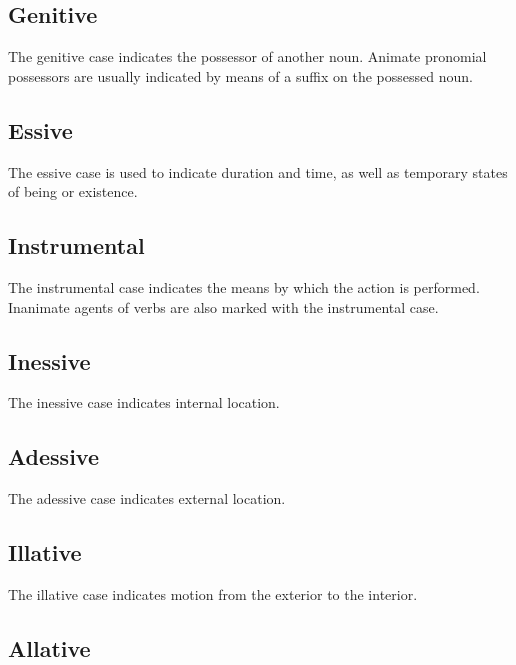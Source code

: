 \documentclass[grammar]{subfiles}
\begin{document}
\subsection{Genitive}
\label{ssec:ns_genitive_case}

The genitive case indicates the possessor of another noun.  Animate pronomial
possessors are usually indicated by means of a suffix on the possessed noun.


\subsection{Essive}
\label{ssec:ns_essive_case}

The essive case is used to indicate duration and time, as well as temporary
states of being or existence.  


\subsection{Instrumental}
\label{ssec:ns_instrumental_case}

The instrumental case indicates the means by which the action is
performed.  Inanimate agents of verbs are also marked with the instrumental case.  


\subsection{Inessive}
\label{ssec:ns_inessive_case}

The inessive case indicates internal location.  


\subsection{Adessive}
\label{ssec:ns_adessive_case}

The adessive case indicates external location.


\subsection{Illative}
\label{ssec:ns_illative_case}

The illative case indicates motion from the exterior to the interior.


\subsection{Allative}
\label{ssec:ns_allative_case}
\end{document}
